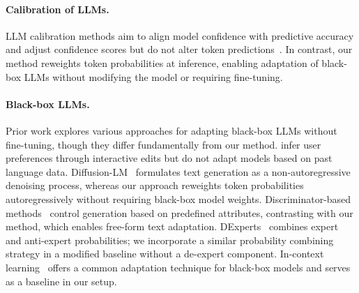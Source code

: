 
\paragraph{Calibration of LLMs.}  
LLM calibration methods aim to align model confidence with predictive accuracy and adjust confidence scores but do not alter token predictions~\citep{ulmer2024calibrating, shenthermometer, huang2024calibrating, kapoor2024calibration, zhu2023calibration}. In contrast, our method reweights token probabilities at inference, enabling adaptation of black-box LLMs without modifying the model or requiring fine-tuning.

\paragraph{Black-box LLMs.}  
Prior work explores various approaches for adapting black-box LLMs without fine-tuning, though they differ fundamentally from our method. \cite{gao2024aligning} infer user preferences through interactive edits but do not adapt models based on past language data. Diffusion-LM~\citep{li2022diffusion} formulates text generation as a non-autoregressive denoising process, whereas our approach reweights token probabilities autoregressively without requiring black-box model weights. Discriminator-based methods~\citep{dathathriplug, mireshghallah2022mix, yang2021fudge, krause2021gedi} control generation based on predefined attributes, contrasting with our method, which enables free-form text adaptation. DExperts~\citep{liu2021dexperts} combines expert and anti-expert probabilities; we incorporate a similar probability combining strategy in a modified baseline without a de-expert component. In-context learning~\citep{long2023adapt, dong2024survey} offers a common adaptation technique for black-box models and serves as a baseline in our setup.
